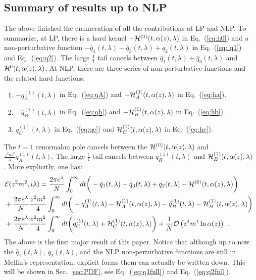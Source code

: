 \documentclass[a4paper,11pt]{article}
\begin{document}
\subsection{Summary of results up to NLP}
The above finished the enumeration of all the contributions at LP and NLP. To summarize, at LP, there is a hard kernel $-{\cal H}^{(0)}(t,\alpha(z),\lambda)$ in Eq.~(\ref{eq:h0}) and a non-perturbative function $-\hat q_1(t,\lambda)-\hat q_3(t,\lambda)+q_2(t,\lambda)$ in Eq.~(\ref{eq: q1}) and Eq.~(\ref{eq:q2}). The large $\frac{1}{t}$ tail cancels between $\hat q_1(t,\lambda)+\hat q_3(t,\lambda)$ and ${\cal H}^{0}(t,\alpha(z),\lambda)$. At NLP, there are three series of non-perturbative functions and the related hard functions:
\begin{enumerate}
    \item $-q^{(1)}_A(t,\lambda)$ in Eq.~(\ref{eq:qA}) and $-{\cal H}^{(1)}_A(t,\alpha(z),\lambda)$ in Eq.~(\ref{eq:ha}).
    \item  $-\hat q^{(1)}_B(t,\lambda)$ in Eq.~(\ref{eq:qb}) and $-{\cal H}^{(1)}_B(t,\alpha(z),\lambda)$ in Eq.~(\ref{eq:hb}).
    \item $q^{(1)}_C(t,\lambda)$ in Eq.~(\ref{eq:qc}) and ${\cal H}^{(1)}_C(t,\alpha(z),\lambda)$ in Eq.~(\ref{eq:hc}). 
\end{enumerate}
 The $t=1$ renormalon pole cancels between the ${\cal H}^{(0)}(t,\alpha(z),\lambda)$ and $\frac{z^2m^2}{4}q^{(1)}_A(t,\lambda)$. The large $\frac{1}{t}$ tail cancels between $\hat q^{(1)}_B(t,\lambda)$ and ${\cal H}^{(1)}_B(t,\alpha(z),\lambda)$.  More explicitly, one has:
\begin{align}
&{\cal E}(z^2m^2,i\lambda)=\frac{2\pi e^{\lambda}}{N}\int_{0}^{\infty} dt\bigg(-\hat q_1(t,\lambda)-\hat q_3(t,\lambda)+q_2(t,\lambda)-{\cal H}^{(0)}(t,\alpha(z),\lambda) \bigg) \nonumber \\ 
&+\frac{2\pi e^{\lambda}}{N}\frac{z^2m^2}{4}\int_{0}^{\infty} dt \bigg(-q_A^{(1)}(t,\lambda)-{\cal H}^{(1)}_A(t,\alpha(z),\lambda)-\hat q_B^{(1)}(t,\lambda)-{\cal H}^{(1)}_B(t,\alpha(z),\lambda)\bigg) \nonumber \\ 
&+\frac{2\pi e^{\lambda}}{N}\frac{z^2m^2}{4}\int_{0}^{\infty} dt \bigg(q_C^{(1)}(t,\lambda)+{\cal H}^{(1)}_C(t,\alpha(z),\lambda)\bigg)+\frac{1}{N}{\cal O}\left(z^4m^4 \ln \alpha(z) \right) \ .
\end{align}
The above is the first major result of this paper. Notice that although up to now the $\hat q_1(t,\lambda)$, $q_2(t,\lambda)$, and the NLP non-perturbative functions are still in Mellin's representation, explicit forms them can actually be written down. This will be shown in Sec.~\ref{sec:PDF}, see Eq.~(\ref{eq:q1full}) and Eq.~(\ref{eq:q2full}).
\end{document}
